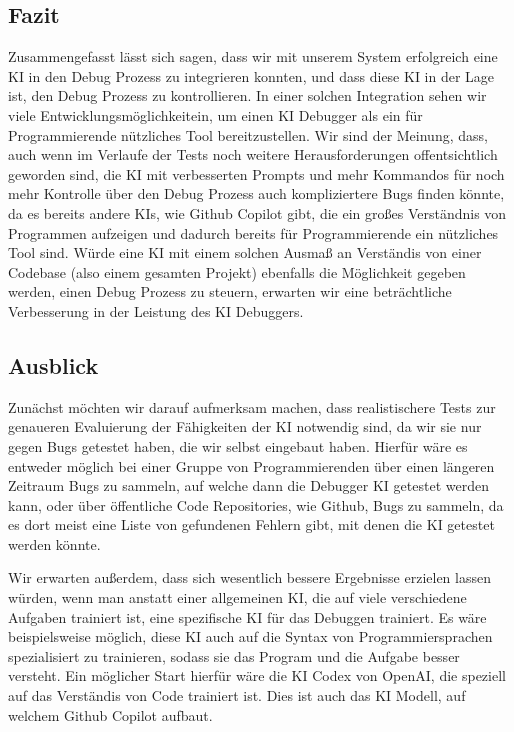 \documentclass[a4paper,12pt,ngerman]{scrartcl}
\begin{document}
\subsection{Fazit}

Zusammengefasst lässt sich sagen, dass wir mit unserem System erfolgreich eine KI in den Debug Prozess zu integrieren konnten, und dass diese KI in der Lage ist, den Debug Prozess zu kontrollieren. In einer solchen Integration sehen wir viele Entwicklungsmöglichkeitein, um einen KI Debugger als ein für Programmierende nützliches Tool bereitzustellen. Wir sind der Meinung, dass, auch wenn im Verlaufe der Tests noch weitere Herausforderungen offentsichtlich geworden sind, die KI mit verbesserten Prompts und mehr Kommandos für noch mehr Kontrolle über den Debug Prozess auch kompliziertere Bugs finden könnte, da es bereits andere KIs, wie Github Copilot gibt, die ein großes Verständnis von Programmen aufzeigen und dadurch bereits für Programmierende ein nützliches Tool sind. Würde eine KI mit einem solchen Ausmaß an Verständis von einer Codebase (also einem gesamten Projekt) ebenfalls die Möglichkeit gegeben werden, einen Debug Prozess zu steuern, erwarten wir eine beträchtliche Verbesserung in der Leistung des KI Debuggers.

\subsection{Ausblick}

Zunächst möchten wir darauf aufmerksam machen, dass realistischere Tests zur genaueren Evaluierung der Fähigkeiten der KI notwendig sind, da wir sie nur gegen Bugs getestet haben, die wir selbst eingebaut haben. Hierfür wäre es entweder möglich bei einer Gruppe von Programmierenden über einen längeren Zeitraum Bugs zu sammeln, auf welche dann die Debugger KI getestet werden kann, oder über öffentliche Code Repositories, wie Github, Bugs zu sammeln, da es dort meist eine Liste von gefundenen Fehlern gibt, mit denen die KI getestet werden könnte.

Wir erwarten außerdem, dass sich wesentlich bessere Ergebnisse erzielen lassen würden, wenn man anstatt einer allgemeinen KI, die auf viele verschiedene Aufgaben trainiert ist, eine spezifische KI für das Debuggen trainiert. Es wäre beispielsweise möglich, diese KI auch auf die Syntax von Programmiersprachen spezialisiert zu trainieren, sodass sie das Program und die Aufgabe besser versteht. Ein möglicher Start hierfür wäre die KI Codex von OpenAI, die speziell auf das Verständis von Code trainiert ist. Dies ist auch das KI Modell, auf welchem Github Copilot aufbaut.
\end{document}
